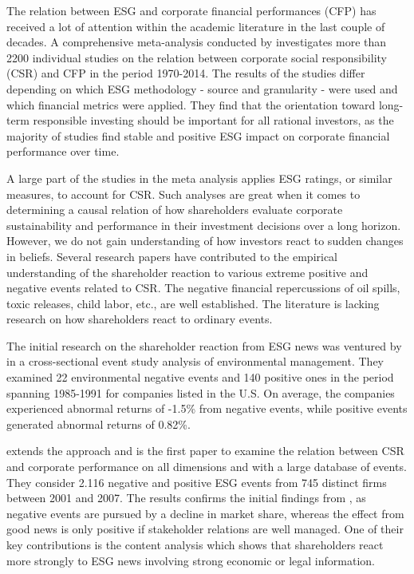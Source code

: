 


The relation between ESG and corporate financial performances (CFP) has received a lot of attention within the academic literature in the last couple of decades. A comprehensive meta-analysis conducted by \cite{ESG_meta_analysis} investigates more than 2200 individual studies on the relation between corporate social responsibility (CSR) and CFP in the period 1970-2014. The results of the studies differ depending on which ESG methodology - source and granularity - were used and which financial metrics were applied. They find that the orientation toward long-term responsible investing should be important for all rational investors, as the majority of studies find stable and positive ESG impact on corporate financial performance over time. 

A large part of the studies in the meta analysis applies ESG ratings, or similar measures, to account for CSR. Such analyses are great when it comes to determining a causal relation of how shareholders evaluate corporate sustainability and performance in their investment decisions over a long horizon. However, we do not gain understanding of how investors react to sudden changes in beliefs. Several research papers have contributed to the empirical understanding of the shareholder reaction to various extreme positive and negative events related to CSR. The negative financial repercussions of oil spills, toxic releases, child labor, etc., are well established. The literature is lacking research on how shareholders react to ordinary events. 

The initial research on the shareholder reaction from ESG news was ventured by \cite{klassen1996impact} in a cross-sectional event study analysis of environmental management. They examined 22 environmental negative events and 140 positive ones in the period spanning 1985-1991 for companies listed in the U.S. On average, the companies experienced abnormal returns of -1.5\% from negative events, while positive events generated abnormal returns of 0.82\%. 

\cite{kruger2015corporate} extends the approach and is the first paper to examine the relation between CSR and corporate performance on all dimensions and with a large database of events. They consider 2.116 negative and positive ESG events from 745 distinct firms between 2001 and 2007. The results confirms the initial findings from \citeauthor{klassen1996impact}, as negative events are pursued by a decline in market share, whereas the effect from good news is only positive if stakeholder relations are well managed. One of their key contributions is the content analysis which shows that shareholders react more strongly to ESG news involving strong economic or legal information. 

